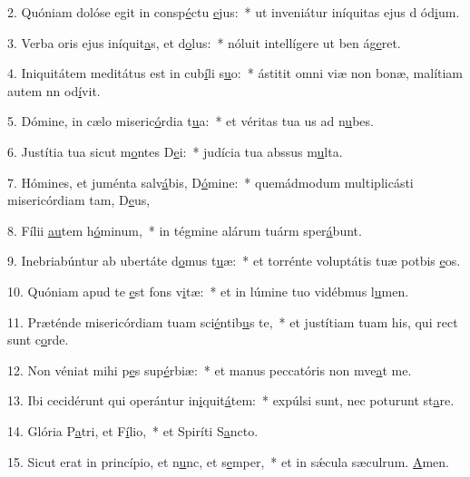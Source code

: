 2. Quóniam dolóse egit in consp\uline{é}ctu \uline{e}jus:~* ut inveniátur iníquitas ejus d ód\uline{i}um.\par 
3. Verba oris ejus iníquit\uline{a}s, et d\uline{o}lus:~* nóluit intellígere ut ben ág\uline{e}ret.\par 
4. Iniquitátem meditátus est in cub\uline{í}li s\uline{u}o:~* ástitit omni viæ non bonæ, malítiam autem nn od\uline{í}vit.\par 
5. Dómine, in cælo miseric\uline{ó}rdia t\uline{u}a:~* et véritas tua us ad n\uline{u}bes.\par 
6. Justítia tua sicut m\uline{o}ntes D\uline{e}i:~* judícia tua abssus m\uline{u}lta.\par 
7. Hómines, et juménta salv\uline{á}bis, D\uline{ó}mine:~* quemádmodum multiplicásti misericórdiam tam, D\uline{e}us,\par 
8. Fílii \uline{au}tem h\uline{ó}minum,~* in tégmine alárum tuárm sper\uline{á}bunt.\par 
9. Inebriabúntur ab ubertáte d\uline{o}mus t\uline{u}æ:~* et torrénte voluptátis tuæ potbis \uline{e}os.\par 
10. Quóniam apud te \uline{e}st fons v\uline{i}tæ:~* et in lúmine tuo vidébmus l\uline{u}men.\par 
11. Præténde misericórdiam tuam sci\uline{é}ntib\uline{u}s te,~* et justítiam tuam his, qui rect sunt c\uline{o}rde.\par 
12. Non véniat mihi p\uline{e}s sup\uline{é}rbiæ:~* et manus peccatóris non mve\uline{a}t me.\par 
13. Ibi cecidérunt qui operántur in\uline{i}quit\uline{á}tem:~* expúlsi sunt, nec poturunt st\uline{a}re.\par 
14. Glória P\uline{a}tri, et F\uline{í}lio,~* et Spiríti S\uline{a}ncto.\par 
15. Sicut erat in princípio, et n\uline{u}nc, et s\uline{e}mper,~* et in sǽcula sæculrum. \uline{A}men.\par 
